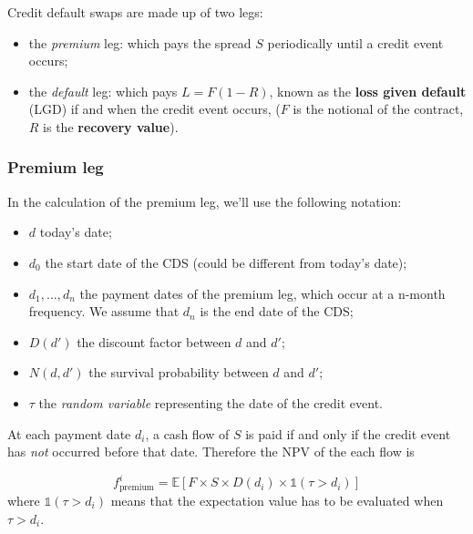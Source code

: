 Credit default swaps are made up of two legs:

\begin{itemize}
\tightlist
\item
  the \emph{premium} leg: which pays the spread \(S\) periodically until a credit event occurs;
\item
  the \emph{default} leg: which pays \(L = F(1 - R)\), known as the
  \textbf{loss given default} (LGD) if and when the credit event occurs, ($F$ is the notional of the contract, $R$ is the \textbf{recovery value}).
\end{itemize}

\subsubsection{Premium leg}\label{premium-leg}

In the calculation of the premium leg, we'll use the following notation:

\begin{itemize}
\tightlist
\item
  \(d\) today's date;
\item
  \(d_0\) the start date of the CDS (could be different from today's date);
\item
  \(d_1, ..., d_n\) the payment dates of the premium leg, which occur at
  a n-month frequency. We assume that \(d_n\) is the end date of the CDS;
\item
  \(D(d')\) the discount factor between \(d\) and \(d'\);
\item
  \(N(d, d')\) the survival probability between \(d\) and \(d'\);
\item
  \(\tau\) the \emph{random variable} representing the date of the credit event.
\end{itemize}

At each payment date \(d_i\), a cash flow of \(S\) is paid if and only if the
credit event has \emph{not} occurred before that date. Therefore the NPV of the
each flow is

\begin{equation}
f_{\textrm{premium}}^i = \mathbb{E}\left[F\times S \times D(d_i) \times \mathbb{1}(\tau > d_i) \right]\end{equation}
where \(\mathbb{1}(\tau > d_i)\) means that the expectation value has to
be evaluated when \(\tau > d_i\). 


